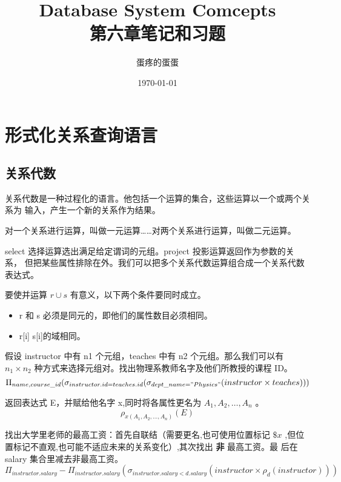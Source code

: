 \documentclass{dingjia}
\author{蛋疼的蛋蛋}
\date{\today}
\title{Database System Comcepts \\ 第六章笔记和习题}
\begin{document}

\section*{形式化关系查询语言}\label{sec:orgb083c41}

\subsection*{关系代数}\label{sec:org6d1d305}

关系代数是一种过程化的语言。他包括一个运算的集合，这些运算以一个或两个关系为
输入，产生一个新的关系作为结果。

对一个关系进行运算，叫做一元运算……对两个关系进行运算，叫做二元运算。

select 选择运算选出满足给定谓词的元组。project 投影运算返回作为参数的关系，
但把某些属性排除在外。我们可以把多个关系代数运算组合成一个关系代数表达式。

要使并运算 $r \cup s$ 有意义，以下两个条件要同时成立。
\begin{itemize}
\item r 和 s 必须是同元的，即他们的属性数目必须相同。
\item r[i] s[i]的域相同。
\end{itemize}

假设 instructor 中有 n1 个元组，teaches 中有 n2 个元组。那么我们可以有 $n_1 \times n_2$ 种方式来选择元组对。找出物理系教师名字及他们所教授的课程 ID。
\begin{equation}
\Pi_{name,course\_id}(\sigma_{instructor.id = teaches.id}(\sigma_{dept\_name = "Physics"}(instructor \times teaches)))
\end{equation}

返回表达式 E，并赋给他名字 x,同时将各属性更名为 $A_1, A_2, \ldots , A_n$ 。
\begin{equation}
\rho_{x(A_1, A_2,\ldots , A_n)}(E)
\end{equation}

找出大学里老师的最高工资：首先自联结（需要更名,也可使用位置标记 $\$x$ ,但位
置标记不直观,也可能不适应未来的关系变化）,其次找出 \textbf{非} 最高工资。最
后在salary 集合里减去非最高工资。
\begin{equation}
\Pi_{instructor.salary} - \Pi_{instructor.salary}(\sigma_{instructor.salary < d.salary}(instructor \times \rho_{d}(instructor)))
\end{equation}
\end{document}
